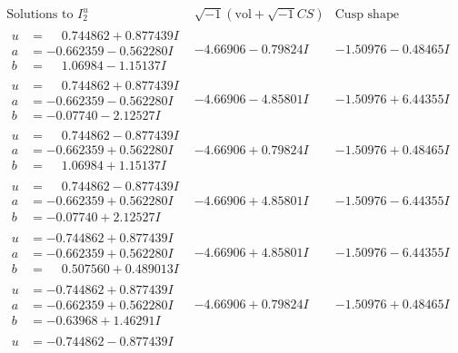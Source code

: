 \documentclass[1p]{elsarticle_modified}
\theoremstyle{definition}
\newcommand{\I}{\sqrt{-1}}
\begin{document}
$$\begin{array}{c|c|c}  
\text{Solutions to }I^u_{2}& \I (\text{vol} + \sqrt{-1}CS) & \text{Cusp shape}\\
 \hline 
\begin{aligned}
u &= \phantom{-}0.744862 + 0.877439 I \\
a &= -0.662359 - 0.562280 I \\
b &= \phantom{-}1.06984 - 1.15137 I\end{aligned}
 & -4.66906 - 0.79824 I & -1.50976 - 0.48465 I \\ \hline\begin{aligned}
u &= \phantom{-}0.744862 + 0.877439 I \\
a &= -0.662359 - 0.562280 I \\
b &= -0.07740 - 2.12527 I\end{aligned}
 & -4.66906 - 4.85801 I & -1.50976 + 6.44355 I \\ \hline\begin{aligned}
u &= \phantom{-}0.744862 - 0.877439 I \\
a &= -0.662359 + 0.562280 I \\
b &= \phantom{-}1.06984 + 1.15137 I\end{aligned}
 & -4.66906 + 0.79824 I & -1.50976 + 0.48465 I \\ \hline\begin{aligned}
u &= \phantom{-}0.744862 - 0.877439 I \\
a &= -0.662359 + 0.562280 I \\
b &= -0.07740 + 2.12527 I\end{aligned}
 & -4.66906 + 4.85801 I & -1.50976 - 6.44355 I \\ \hline\begin{aligned}
u &= -0.744862 + 0.877439 I \\
a &= -0.662359 + 0.562280 I \\
b &= \phantom{-}0.507560 + 0.489013 I\end{aligned}
 & -4.66906 + 4.85801 I & -1.50976 - 6.44355 I \\ \hline\begin{aligned}
u &= -0.744862 + 0.877439 I \\
a &= -0.662359 + 0.562280 I \\
b &= -0.63968 + 1.46291 I\end{aligned}
 & -4.66906 + 0.79824 I & -1.50976 + 0.48465 I \\ \hline\begin{aligned}
u &= -0.744862 - 0.877439 I \\

\end{aligned}
\end{array}$$
\end{document}
